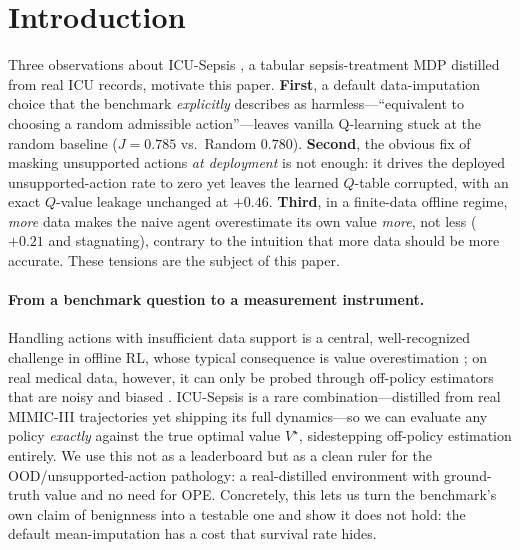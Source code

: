 \documentclass{article}
\begin{document}
\section{Introduction}
\label{sec:intro}
Three observations about ICU-Sepsis \citep{choudhary2024icusepsis}, a tabular
sepsis-treatment MDP distilled from real ICU records, motivate this paper.
\textbf{First}, a default data-imputation choice that the benchmark
\emph{explicitly} describes as harmless---``equivalent to choosing a random
admissible action''---leaves vanilla Q-learning stuck at the random baseline
($J{=}0.785$ vs.\ Random $0.780$). \textbf{Second}, the obvious fix of masking
unsupported actions \emph{at deployment} is not enough: it drives the deployed
unsupported-action rate to zero yet leaves the learned $Q$-table corrupted, with
an exact $Q$-value leakage unchanged at $+0.46$. \textbf{Third}, in a finite-data
offline regime, \emph{more} data makes the naive agent overestimate its own value
\emph{more}, not less ($+0.21$ and stagnating), contrary to the intuition that
more data should be more accurate. These tensions are the subject of this paper.

\paragraph{From a benchmark question to a measurement instrument.}
Handling actions with insufficient data support is a central, well-recognized
challenge in offline RL, whose typical consequence is value overestimation
\citep{fujimoto2019bcq,kumar2020cql}; on real medical data, however, it can only
be probed through off-policy estimators that are noisy and biased
\citep{gottesman2019guidelines,gottesman2018evaluating}. ICU-Sepsis is a rare
combination---distilled from real MIMIC-III trajectories yet shipping its full
dynamics---so we can evaluate any policy \emph{exactly} against the true optimal
value $V^\star$, sidestepping off-policy estimation entirely. We use this not as a
leaderboard but as a clean ruler for the OOD/unsupported-action pathology: a
real-distilled environment with ground-truth value and no need for OPE. Concretely,
this lets us turn the benchmark's own claim of benignness into a testable one and
show it does not hold: the default mean-imputation has a cost that survival rate hides.
\end{document}
